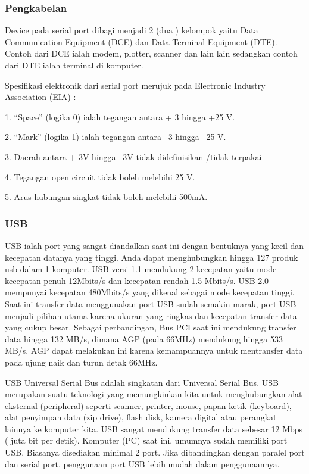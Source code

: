 \subsubsection{Pengkabelan}
Device pada serial port dibagi menjadi 2 (dua ) kelompok yaitu Data Communication Equipment (DCE) dan Data Terminal Equipment (DTE). Contoh dari DCE ialah modem, plotter, scanner dan lain lain sedangkan contoh dari DTE ialah terminal di komputer.

Spesifikasi elektronik dari serial port merujuk pada Electronic Industry Association (EIA) :

1. “Space” (logika 0) ialah tegangan antara + 3 hingga +25 V.

2. “Mark” (logika 1) ialah tegangan antara –3 hingga –25 V.

3. Daerah antara + 3V hingga –3V tidak didefinisikan /tidak terpakai

4. Tegangan open circuit tidak boleh melebihi 25 V.

5. Arus hubungan singkat tidak boleh melebihi 500mA.

\subsubsection{USB}
USB ialah port yang sangat diandalkan saat ini dengan bentuknya yang kecil dan kecepatan datanya yang tinggi. Anda dapat menghubungkan hingga 127 produk usb dalam 1 komputer. USB versi 1.1 mendukung 2 kecepatan yaitu mode kecepatan penuh 12Mbits/s dan kecepatan rendah 1.5 Mbits/s. USB 2.0 mempunyai kecepatan 480Mbits/s yang dikenal sebagai mode kecepatan tinggi. 
Saat ini transfer data menggunakan port USB sudah semakin marak, port USB menjadi pilihan utama karena ukuran yang ringkas dan kecepatan transfer data yang cukup besar.  Sebagai perbandingan, Bus  PCI saat ini mendukung transfer data hingga 132 MB/s, dimana AGP (pada 66MHz) mendukung hingga 533 MB/s. AGP  dapat melakukan ini karena kemampuannya untuk mentransfer data pada ujung naik dan turun detak 66MHz.

USB Universal Serial Bus adalah singkatan dari Universal Serial Bus. USB merupakan suatu teknologi yang memungkinkan kita untuk menghubungkan alat eksternal (peripheral) seperti scanner, printer, mouse, papan ketik (keyboard), alat penyimpan data (zip drive), flash disk, kamera digital atau perangkat lainnya ke komputer kita. USB sangat mendukung transfer data sebesar 12 Mbps ( juta bit per detik). Komputer (PC) saat ini, umumnya sudah memiliki port USB. Biasanya disediakan minimal 2 port. Jika dibandingkan dengan paralel port dan serial port, penggunaan port USB lebih mudah dalam penggunaannya.

